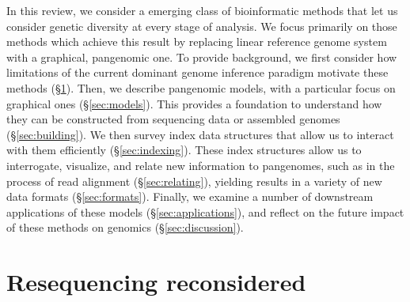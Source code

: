 In this review, we consider a emerging class of bioinformatic methods that let us consider genetic diversity at every stage of analysis.
We focus primarily on those methods which achieve this result by replacing linear reference genome system with a graphical, pangenomic one.
To provide background, we first consider how limitations of the current dominant genome inference paradigm motivate these methods (\S \ref{sec:resequencing}).
Then, we describe pangenomic models, with a particular focus on graphical ones (\S \ref{sec:models}).
This provides a foundation to understand how they can be constructed from sequencing data or assembled genomes (\S \ref{sec:building}).
We then survey index data structures that allow us to interact with them efficiently (\S \ref{sec:indexing}).
These index structures allow us to interrogate, visualize, and relate new information to pangenomes, such as in the process of read alignment (\S \ref{sec:relating}), yielding results in a variety of new data formats (\S \ref{sec:formats}).
Finally, we examine a number of downstream applications of these models (\S \ref{sec:applications}), and reflect on the future impact of these methods on genomics (\S \ref{sec:discussion}).





\section{Resequencing reconsidered}
\label{sec:resequencing}


